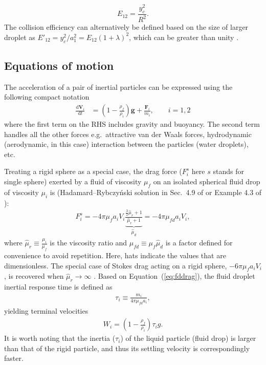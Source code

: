 \documentclass[../thesis.tex]{subfiles}
\begin{document}
\begin{equation}
E_{12} = \frac{y_c^2}{R^2}.
\end{equation}
The collision efficiency can alternatively be defined based on the size of larger droplet as $E'_{12} = y_c^2/a_1^2=E_{12}(1+\lambda)^2$, which can be greater than unity \citep{YR96}.

\subsection{Equations of motion}

The acceleration of a pair of inertial particles can be expressed using the following compact notation
\begin{align}
\frac{\text{d} \boldsymbol{V}_i}{\text{d} t} &= \left(1-\frac{\rho_f}{\rho_i}\right)\boldsymbol{g}+\frac{\boldsymbol{F}_i}{m_i}, \qquad i=1,2
\label{eq:acc}
\end{align}
where the first term on the RHS includes gravity and buoyancy. The second term handles all the other forces e.g.\ attractive van der Waals forces, hydrodynamic (aerodynamic, in this case) interaction between the particles (water droplets), etc.

Treating a rigid sphere as a special case, the drag force ($F_i^s$ here $s$ stands for single sphere) exerted by a fluid of viscosity $\mu_f$ on an isolated spherical fluid drop of viscosity $\mu_i$ is (Hadamard--Rybczy{\'n}ski solution in Sec.\ 4.9 of \cite{B00} or Example 4.3 of \cite{KK13}):
\begin{align}
F_i^s = -4\pi\mu_f a_i V_i
\underbrace{\frac{\tfrac{3}{2}\hat{\mu}_r+1}{\hat{\mu}_r+1}}_{\hat{\mu}_d}
=
-4\pi\mu_{fd} a_i V_i,\label{eq:fddrag}
\end{align}
where $\hat{\mu}_r\equiv\tfrac{\mu_i}{\mu_f}$ is the viscosity ratio and $\mu_{fd}\equiv\mu_f\hat{\mu}_d$ is a factor defined for convenience to avoid repetition. Here, hats indicate the values that are dimensionless. The special case of Stokes drag acting on a rigid sphere, $-6\pi\mu_f a_i V_i$, is recovered when $\hat{\mu}_r\to\infty$ \citep{KK13}. Based on Equation~(\ref{eq:fddrag}), the fluid droplet inertial response time is defined as
\begin{align}
\tau_i \equiv \frac{m_i}{4\pi\mu_{fd}a_i},\label{eq:tau}
\end{align}
yielding terminal velocities
\begin{align}
W_i = \left(1-\frac{\rho_f}{\rho_i}\right)\tau_i g.\label{eq:w}
\end{align}
It is worth noting that the inertia ($\tau_i$) of the liquid particle (fluid drop) is larger than that of the rigid particle, and thus its settling velocity is correspondingly faster.
\end{document}
